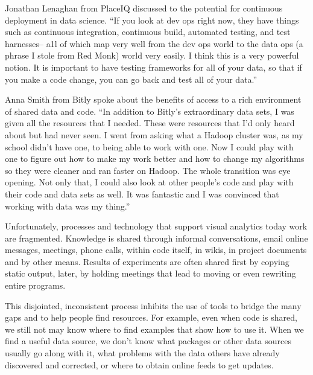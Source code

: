 Jonathan Lenaghan from PlaceIQ discussed to the potential
for continuous deployment in data science.
``If you look at dev ops right now, they have things
such as continuous integration, continuous build,
automated testing, and test harnesses-- a1l of which
map very well from the dev ops world to the data ops
(a phrase I stole from Red Monk) world very easily. I
think this is a very powerful notion. It is important to
have testing frameworks for all of your data, so that if
you make a code change, you can go back and test all
of your data.''

Anna Smith from Bitly spoke about the benefits of access to
a rich environment of shared data and code.
``In addition to Bitly's extraordinary data sets,
I was given all the resources that I needed. These were
resources that I’d only heard about but had never
seen. I went from asking what a Hadoop cluster was,
as my school didn't have one, to being able to work
with one. Now I could play with one to figure out how
to make my work better and how to change my
algorithms so they were cleaner and ran faster on
Hadoop. The whole transition was eye opening. Not
only that, I could also look at other people’s code and
play with their code and data sets as well. It was
fantastic and I was convinced that working with data was my thing.''


Unfortunately, processes and technology that support visual analytics today
work are fragmented.
Knowledge is shared through informal conversations, email online messages,
meetings, phone calls, within code itself, in wikis, in project documents and
by other means. Results of experiments are often shared first by copying static
output, later, by holding meetings that lead to moving or even rewriting
entire programs.

This disjointed, inconsistent process inhibits the use of tools to bridge
the many gaps and to help people find resources.
For example, even when code is shared, we still not may know where to
find examples that show how to use it.
When we find a useful data source, we don't know what packages or
other data sources usually go along with it, what problems with the data
others have already discovered and corrected, or where to obtain online feeds
to get updates.


